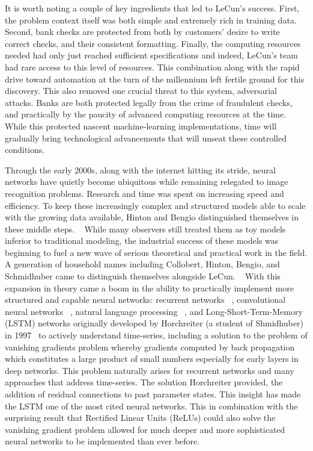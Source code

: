 It is worth noting a couple of key ingredients that led to LeCun's
success. First, the problem context itself was both simple and
extremely rich in training data. Second, bank checks are protected from
both by customers' desire to write correct checks, and their
consistent formatting. Finally, the computing resources needed had only just
reached sufficient specifications and indeed, LeCun's team had rare
access to this level of resources. This combination along with the
rapid drive toward automation at the turn of the millennium left
fertile ground for this discovery. This also removed one crucial
threat to this system, adversarial attacks. Banks are both protected
legally from the crime of fraudulent checks, and practically by the
paucity of advanced computing resources at the time. While this
protected nascent machine-learning implementations, time will
gradually bring technological advancements that will unseat these
controlled conditions. 

Through the early 2000s, along with the internet hitting its stride,
neural networks have quietly become ubiquitous while  remaining
relegated to image recognition problems. Research and time was spent on increasing
speed and efficiency. To keep these increasingly complex and structured models able
to scale with the growing data available, Hinton and Bengio
distinguished themselves in these middle steps. 
~\cite{bengio2007greedy, hinton2006reducing, hinton2006fast}
While many observers still treated
them as toy models inferior to traditional modeling,  the
industrial success of these models was beginning to fuel a new wave of
serious theoretical and practical work in the field. A generation of
household names including Collobert, Hinton, Bengio, and Schmidhuber
came to distinguish themselves alongside LeCun. 
~\cite{coates2011analysis,
vincent2010stacked,
boureau2010learning,
hinton2010practical,
glorot2010understanding,
erhan2010does,
bengio2009learning}
With this expansion in theory came a boom in the ability to
practically implement more structured and capable neural networks: recurrent networks ~\cite{mikolov2010recurrent},
convolutional neural networks ~\cite{lee2009convolutional}, natural
language processing ~\cite{collobert2011natural}, and
Long-Short-Term-Memory (LSTM) networks originally developed by
Horchreiter (a student of Shmidhuber) in
1997~\cite{hochreiter1997long} to actively understand time-series,
including a solution to the problem of vanishing
gradients problem whereby gradients computed by back propagation which
constitutes a large product of small numbers especially for early
layers in deep networks. This problem naturally arises for recurrent
networks and many approaches that address time-series. The solution
Horchreiter provided, the addition of residual connections to past
parameter states. This insight has made the LSTM one of the most cited
neural networks. This in combination with the surprising result that
Rectified Linear Units (ReLUs) could also solve the vanishing gradient
problem allowed for much deeper and more sophisticated neural networks
to be implemented than ever before. 

